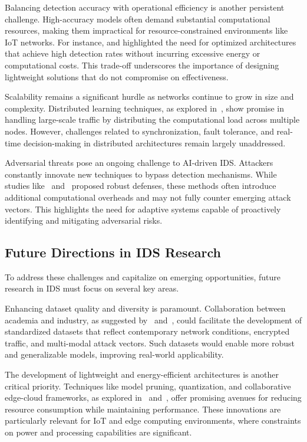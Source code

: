 Balancing detection accuracy with operational efficiency is another persistent challenge. High-accuracy models often demand substantial computational resources, making them impractical for resource-constrained environments like IoT networks. For instance, \cite{wang2023} and\cite{Sowmya2023} highlighted the need for optimized architectures that achieve high detection rates without incurring excessive energy or computational costs. This trade-off underscores the importance of designing lightweight solutions that do not compromise on effectiveness.

Scalability remains a significant hurdle as networks continue to grow in size and complexity. Distributed learning techniques, as explored in~\cite{Dandaras2023}, show promise in handling large-scale traffic by distributing the computational load across multiple nodes. However, challenges related to synchronization, fault tolerance, and real-time decision-making in distributed architectures remain largely unaddressed.

Adversarial threats pose an ongoing challenge to AI-driven IDS. Attackers constantly innovate new techniques to bypass detection mechanisms. While studies like~\cite{Alotaibi2023AML} and~\cite{Roshan2024} proposed robust defenses, these methods often introduce additional computational overheads and may not fully counter emerging attack vectors. This highlights the need for adaptive systems capable of proactively identifying and mitigating adversarial risks.



\subsection{Future Directions in IDS Research}
To address these challenges and capitalize on emerging opportunities, future research in IDS must focus on several key areas.

Enhancing dataset quality and diversity is paramount. Collaboration between academia and industry, as suggested by~\cite{Gutierrez2023} and~\cite{Roshan2024}, could facilitate the development of standardized datasets that reflect contemporary network conditions, encrypted traffic, and multi-modal attack vectors. Such datasets would enable more robust and generalizable models, improving real-world applicability.

The development of lightweight and energy-efficient architectures is another critical priority. Techniques like model pruning, quantization, and collaborative edge-cloud frameworks, as explored in~\cite{Sowmya2023} and~\cite{Mohammad2024}, offer promising avenues for reducing resource consumption while maintaining performance. These innovations are particularly relevant for IoT and edge computing environments, where constraints on power and processing capabilities are significant.

